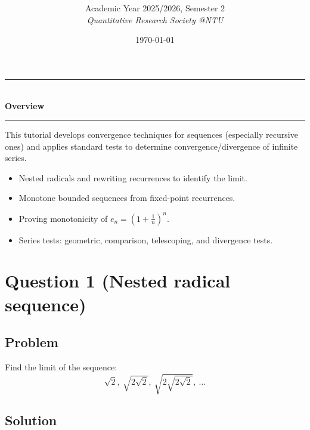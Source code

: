 \documentclass[12pt]{article}
\title{
\CourseCode \CourseName \\[0.3em]
\large \DocType
}
\author{
  Academic Year 2025/2026, Semester 2 \\[0.25em]
  \textit{Quantitative Research Society @NTU}
}
\date{\today}
\begin{document}
\maketitle
\thispagestyle{plainfirst}
\pagestyle{main}

\bigskip


\begin{center}
\rule{0.8\textwidth}{0.4pt}\\[4pt]
\textbf{Overview}\\[2pt]
\rule{0.8\textwidth}{0.4pt}
\end{center}

\noindent
This tutorial develops convergence techniques for sequences (especially recursive ones) and applies standard tests to determine convergence/divergence of infinite series.

\begin{itemize}[leftmargin=*]
\item Nested radicals and rewriting recurrences to identify the limit.
\item Monotone bounded sequences from fixed-point recurrences.
\item Proving monotonicity of \(e_n=\left(1+\frac{1}{n}\right)^n\).
\item Series tests: geometric, comparison, telescoping, and divergence tests.
\end{itemize}

\bigskip

\newpage


\section*{Question 1 (Nested radical sequence)}

\subsection*{Problem}
Find the limit of the sequence:
\[
\sqrt{2},\ \sqrt{2\sqrt{2}},\ \sqrt{2\sqrt{2\sqrt{2}}},\ \ldots
\]

\subsection*{Solution}
\end{document}

